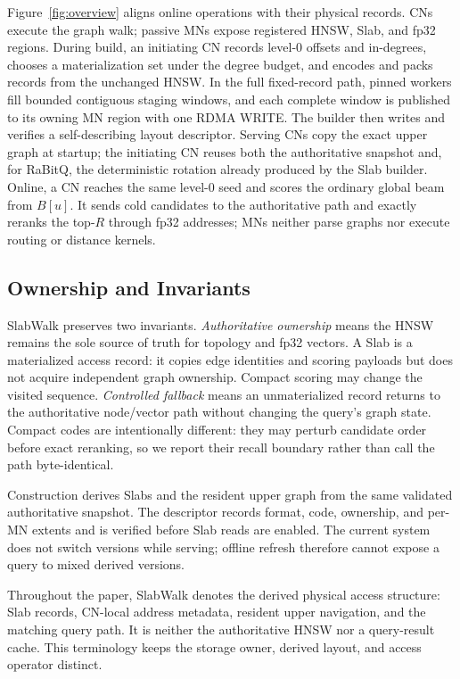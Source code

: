 \documentclass[sigconf,nonacm]{acmart}
\newcommand{\sys}{SlabWalk}
\begin{document}
Figure~\ref{fig:overview} aligns online operations with their physical records.
CNs execute the graph walk; passive MNs expose registered HNSW, Slab, and fp32
regions.  During build, an initiating CN records level-0 offsets and
in-degrees, chooses a materialization set under the degree budget, and encodes
and packs records from the unchanged HNSW\@.  In the
full fixed-record path, pinned workers fill bounded contiguous staging windows,
and each complete window is published to its owning MN region with one RDMA
WRITE.  The builder then writes and
verifies a self-describing layout descriptor.  Serving CNs copy the exact upper
graph at startup; the initiating CN reuses both the authoritative snapshot and,
for RaBitQ, the deterministic rotation already produced by the Slab builder.
Online, a CN reaches the same level-0 seed and
scores the ordinary global beam from $B[u]$.  It sends cold candidates to the
authoritative path and exactly reranks the top-$R$ through fp32 addresses; MNs
neither parse graphs nor execute routing or distance kernels.

\subsection{Ownership and Invariants}

SlabWalk preserves two invariants.  \emph{Authoritative ownership} means the
HNSW remains the sole source of truth for topology and fp32 vectors.  A Slab is
a materialized access record: it copies edge identities and scoring payloads
but does not acquire independent graph ownership.  Compact scoring may change
the visited sequence.  \emph{Controlled fallback} means an unmaterialized
record returns to the authoritative node/vector path without changing the
query's graph state.  Compact codes are intentionally different: they may
perturb candidate order before exact reranking, so we report their recall
boundary rather than call the path byte-identical.

Construction derives Slabs and the resident upper graph from the same
validated authoritative snapshot.  The descriptor records format, code,
ownership, and per-MN extents and is verified before Slab reads are enabled.
The current system does not switch versions while serving; offline refresh
therefore cannot expose a query to mixed derived versions.

Throughout the paper, \sys{} denotes the derived physical access structure:
Slab records, CN-local address metadata, resident upper navigation, and the
matching query path.  It is neither the authoritative HNSW nor a query-result
cache.  This terminology keeps the storage owner, derived layout, and access
operator distinct.
\end{document}

